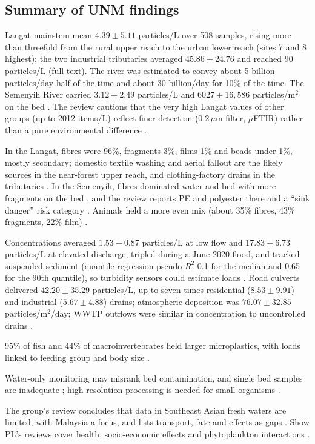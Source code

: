 \documentclass[11pt,a4paper]{article}
\newcommand{\um}{\,\ensuremath{\mu}m}
\begin{document}
\subsection{Summary of UNM findings}
\begin{description}[leftmargin=0pt,labelindent=0pt,style=unboxed]
\item[Abundance.] Langat mainstem mean $4.39\pm5.11$ particles/L over 508 samples, rising more than threefold from the rural upper reach to the urban lower reach (sites 7 and 8 highest); the two industrial tributaries averaged $45.86\pm24.76$ and reached 90 particles/L \cite{chen21a} (full text). The river was estimated to convey about 5 billion particles/day half of the time and about 30 billion/day for 10\% of the time. The Semenyih River carried $3.12\pm2.49$ particles/L and $6027\pm16{,}586$ particles/m$^2$ on the bed \cite{chen23}. The review cautions that the very high Langat values of other groups (up to 2012 items/L) reflect finer detection (0.2\um{} filter, \(\mu\)FTIR) rather than a pure environmental difference \cite{bouida26}.
\item[Type and origin.] In the Langat, fibres were 96\%, fragments 3\%, films 1\% and beads under 1\%, mostly secondary; domestic textile washing and aerial fallout are the likely sources in the near-forest upper reach, and clothing-factory drains in the tributaries \cite{chen21a}. In the Semenyih, fibres dominated water and bed with more fragments on the bed \cite{chen23}, and the review reports PE and polyester there and a ``sink danger'' risk category \cite{bouida26}. Animals held a more even mix (about 35\% fibres, 43\% fragments, 22\% film) \cite{ng24}.
\item[Drivers.] Concentrations averaged $1.53\pm0.87$ particles/L at low flow and $17.83\pm6.73$ particles/L at elevated discharge, tripled during a June 2020 flood, and tracked suspended sediment (quantile regression pseudo-$R^2$ 0.1 for the median and 0.65 for the 90th quantile), so turbidity sensors could estimate loads \cite{chen21a}. Road culverts delivered $42.20\pm35.29$ particles/L, up to seven times residential ($8.53\pm9.91$) and industrial ($5.67\pm4.88$) drains; atmospheric deposition was $76.07\pm32.85$ particles/m$^2$/day; WWTP outflows were similar in concentration to uncontrolled drains \cite{chen22}.
\item[Biota.] 95\% of fish and 44\% of macroinvertebrates held larger microplastics, with loads linked to feeding group and body size \cite{ng24}.
\item[Monitoring advice.] Water-only monitoring may misrank bed contamination, and single bed samples are inadequate \cite{chen23}; high-resolution processing is needed for small organisms \cite{ng24}.
\item[Regional context.] The group's review concludes that data in Southeast Asian fresh waters are limited, with Malaysia a focus, and lists transport, fate and effects as gaps \cite{chen21b}. Show PL's reviews cover health, socio-economic effects and phytoplankton interactions \cite{mofijur21,alowaisy26}.
\end{description}
\end{document}
